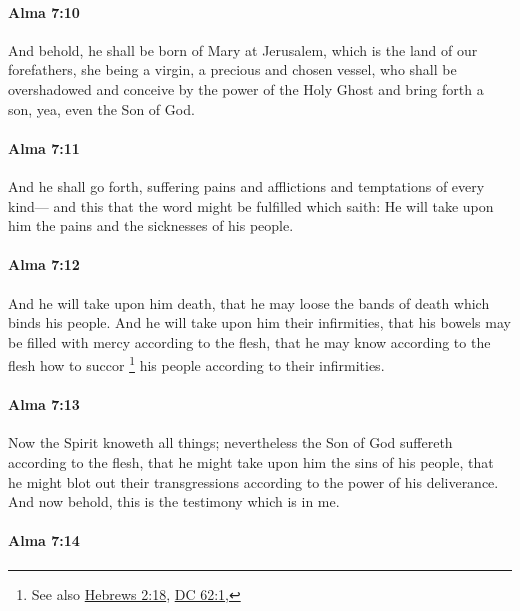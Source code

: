 		\paragraph{Alma 7:10} %
			\label{ALMA-7-10}

			And behold, he shall be born of Mary at Jerusalem,
			which is the land of our forefathers,
			she being a virgin, a precious and chosen vessel,
			who shall be overshadowed
			and conceive by the power of the Holy Ghost
			and bring forth a son,
			yea, even the Son of God.

		\paragraph{Alma 7:11} %
			\label{ALMA-7-11}

			And he shall go forth,
			suffering pains and afflictions and temptations of every kind---
			and this that the word might be fulfilled which saith:
			He will take upon him the pains and the sicknesses of his people.

		\paragraph{Alma 7:12} %
			\label{ALMA-7-12}

			And he will take upon him death,
			that he may loose the bands of death which binds his people.
			And he will take upon him their infirmities,
			that his bowels may be filled with mercy according to the flesh,
			that he may know according to the flesh
			how to succor%
				\footnote{%
					
					
					See also \hyperref[HEBREWS-2-18]{Hebrews 2:18}, \hyperref[DC62-1]{DC 62:1},
					}
			his people according to their infirmities.

		\paragraph{Alma 7:13} %
			\label{ALMA-7-13}

			Now the Spirit knoweth all things;
			nevertheless the Son of God suffereth according to the flesh,
			that he might take upon him the sins of his people,
			that he might blot out their transgressions
			according to the power of his deliverance.
			And now behold, this is the testimony which is in me.

		\paragraph{Alma 7:14} %
			\label{ALMA-7-14}

